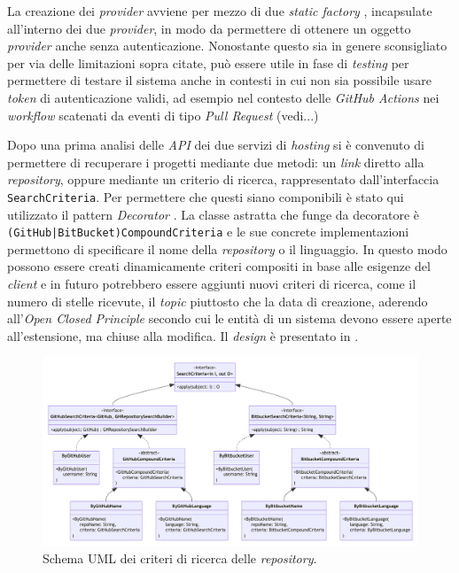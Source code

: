 La creazione dei \textit{provider} avviene per mezzo di due \textit{static factory} \cite{effective-java}, incapsulate all'interno dei due \textit{provider}, in modo da permettere di ottenere un oggetto \textit{provider} anche senza autenticazione.
%
Nonostante questo sia in genere sconsigliato per via delle limitazioni sopra citate, può essere utile in fase di \textit{testing} per permettere di testare il sistema anche in contesti in cui non sia possibile usare \textit{token} di autenticazione validi, ad esempio nel contesto delle \textit{GitHub Actions} nei \textit{workflow} scatenati da eventi di tipo \textit{Pull Request} (vedi...)

Dopo una prima analisi delle \textit{API} dei due servizi di \textit{hosting} si è convenuto di permettere di recuperare i progetti mediante due metodi: un \textit{link} diretto alla \textit{repository}, oppure mediante un criterio di ricerca, rappresentato dall'interfaccia \texttt{SearchCriteria}.
%
Per permettere che questi siano componibili è stato qui utilizzato il pattern \textit{Decorator} \cite{gof}.
%
La classe astratta che funge da decoratore è \texttt{(GitHub|BitBucket)CompoundCriteria} e le sue concrete implementazioni permettono di specificare il nome della \textit{repository} o il linguaggio.
%
In questo modo possono essere creati dinamicamente criteri compositi in base alle esigenze del \textit{client} e in futuro potrebbero essere aggiunti nuovi criteri di ricerca, come il numero di stelle ricevute, il \textit{topic} piuttosto che la data di creazione, aderendo all'\textit{Open Closed Principle} secondo cui le entità di un sistema devono essere aperte all'estensione, ma chiuse alla modifica.
%
Il \textit{design} è presentato in .

\begin{figure}
    \centering
    \includegraphics[width=\textwidth]{resources/img/02-search-criteria.pdf}
    \caption{Schema UML dei criteri di ricerca delle \textit{repository}.}
    \label{img:02-search-criteria}
\end{figure}

